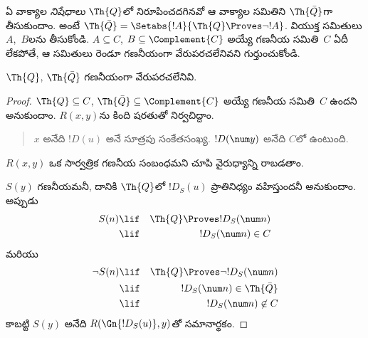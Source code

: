 \documentclass[../../../include/open-logic-section]{subfiles}
\begin{document}



ఏ వాక్యాల {\em నిషేధాలు} $\Th{Q}$లో నిరూపించదగినవో ఆ వాక్యాల సమితిని
$\Th{\bar Q}$గా తీసుకుందాం. అంటే $\Th{\bar Q} = \Setabs{!A}{\Th{Q} \Proves
  \lnot !A}$. వియుక్త సమితులు $A$,~$B$లను తీసుకోండి. $A \subseteq C$, $B \subseteq
\Complement{C}$ అయ్యే గణనీయ సమితి~$C$ ఏదీ లేకపోతే, ఆ సమితులు రెండూ
గణనీయంగా వేరుపరచలేనివని గుర్తుంచుకోండి.

\begin{lem}
$\Th{Q}$, $\Th{\bar Q}$ గణనీయంగా వేరుపరచలేనివి.
\end{lem}

\begin{proof}
$\Th{Q} \subseteq C$, $\Th{\bar Q} \subseteq \Complement{C}$ అయ్యే గణనీయ
సమితి~$C$ ఉందని అనుకుందాం. $R(x,y)$ను కింది షరతుతో నిర్వచిద్దాం.
\begin{quote}
$x$ అనేది $!D(u)$ అనే సూత్రపు సంకేతసంఖ్య. $!D(\num y)$ అనేది
$C$లో ఉంటుంది.
\end{quote}
$R(x,y)$ ఒక సార్వత్రిక గణనీయ సంబంధమని చూపి వైరుధ్యాన్ని రాబడతాం.

$S(y)$ గణనీయమనీ, దానికి $\Th{Q}$లో $!D_S(u)$ ప్రాతినిధ్యం వహిస్తుందనీ
అనుకుందాం. అప్పుడు
\begin{eqnarray*}
S(n) & \lif & \Th{Q} \Proves !D_S(\num n) \\
& \lif & !D_S(\num n) \in C
\end{eqnarray*}
మరియు
\begin{eqnarray*}
\lnot S(n) & \lif & \Th{Q} \Proves \lnot !D_S(\num n) \\
& \lif & !D_S(\num n) \in \Th{\bar Q} \\
& \lif & !D_S(\num n) \not\in C
\end{eqnarray*}
కాబట్టి $S(y)$ అనేది $R(\Gn{!D_S(u)},y)$తో సమానార్థకం.
\end{proof}
\end{document}
